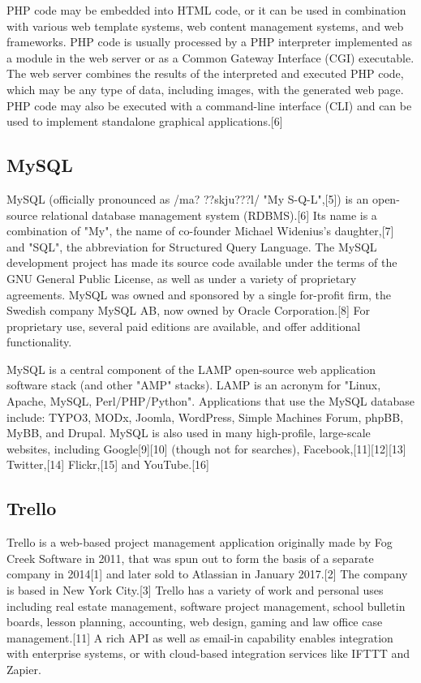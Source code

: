 \documentclass[12pt,a4paper]{article}
\begin{document}
\begin{flushleft}
	PHP code may be embedded into HTML code, or it can be used in combination with various web template systems, web content management systems, and web frameworks. PHP code is usually processed by a PHP interpreter implemented as a module in the web server or as a Common Gateway Interface (CGI) executable. The web server combines the results of the interpreted and executed PHP code, which may be any type of data, including images, with the generated web page. PHP code may also be executed with a command-line interface (CLI) and can be used to implement standalone graphical applications.[6]
	\subsection{MySQL}
	MySQL (officially pronounced as /ma? ??skju???l/ "My S-Q-L",[5]) is an open-source relational database management system (RDBMS).[6] Its name is a combination of "My", the name of co-founder Michael Widenius's daughter,[7] and "SQL", the abbreviation for Structured Query Language. The MySQL development project has made its source code available under the terms of the GNU General Public License, as well as under a variety of proprietary agreements. MySQL was owned and sponsored by a single for-profit firm, the Swedish company MySQL AB, now owned by Oracle Corporation.[8] For proprietary use, several paid editions are available, and offer additional functionality.
	
	MySQL is a central component of the LAMP open-source web application software stack (and other "AMP" stacks). LAMP is an acronym for "Linux, Apache, MySQL, Perl/PHP/Python". Applications that use the MySQL database include: TYPO3, MODx, Joomla, WordPress, Simple Machines Forum, phpBB, MyBB, and Drupal. MySQL is also used in many high-profile, large-scale websites, including Google[9][10] (though not for searches), Facebook,[11][12][13] Twitter,[14] Flickr,[15] and YouTube.[16]
	\subsection{Trello}
	Trello is a web-based project management application originally made by Fog Creek Software in 2011, that was spun out to form the basis of a separate company in 2014[1] and later sold to Atlassian in January 2017.[2] The company is based in New York City.[3]
	Trello has a variety of work and personal uses including real estate management, software project management, school bulletin boards, lesson planning, accounting, web design, gaming and law office case management.[11] A rich API as well as email-in capability enables integration with enterprise systems, or with cloud-based integration services like IFTTT and Zapier.
	

\end{flushleft}
\end{document}
